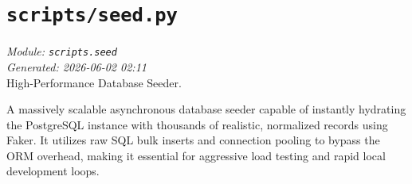 
\section{\texttt{scripts/seed.py}}
\textit{Module: \texttt{scripts.seed}} \\
\textit{Generated: 2026-06-02 02:11} \\

High-Performance Database Seeder.

A massively scalable asynchronous database seeder capable of instantly
hydrating the PostgreSQL instance with thousands of realistic,
normalized records using Faker. It utilizes raw SQL bulk inserts and
connection pooling to bypass the ORM overhead, making it essential for
aggressive load testing and rapid local development loops.
